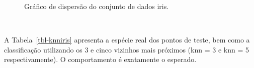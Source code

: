 \documentclass[
  a4paperpaper,
]{article}
\begin{document}
\begin{figure}[H]


\caption{\label{fig-scatteriris2}Gráfico de dispersão do conjunto de
dados iris.}

\end{figure}%

~

A Tabela~\ref{tbl-knniris} apresenta a espécie real dos pontos de teste,
bem como a classificação utilizando os 3 e cinco vizinhos mais próximos
(knn = 3 e knn = 5 respectivamente). O comportamento é exatamente o
esperado.

~
\end{document}
